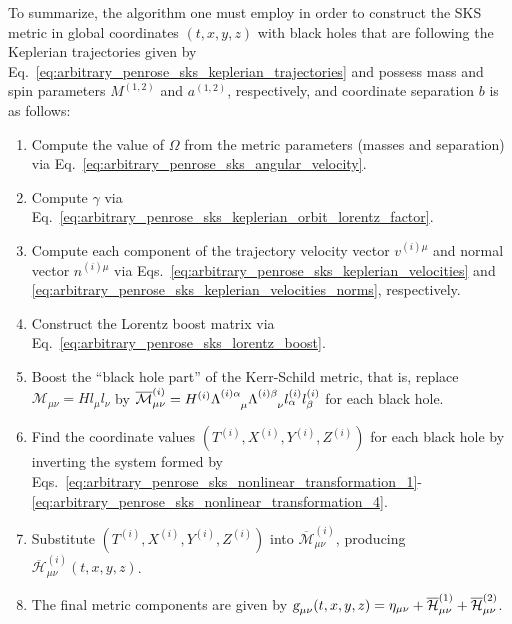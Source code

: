 To summarize, the algorithm one must employ in order to construct the SKS metric in global coordinates $(t,x,y,z)$ with black holes that are following the Keplerian trajectories given by Eq.~\eqref{eq:arbitrary_penrose_sks_keplerian_trajectories} and possess mass and spin parameters $M^{(1,2)}$ and $a^{(1,2)}$, respectively, and coordinate separation $b$ is as follows:
%
\begin{enumerate}
  \item Compute the value of $\Omega$ from the metric parameters (masses and separation) via Eq.~\eqref{eq:arbitrary_penrose_sks_angular_velocity}.
  \item Compute $\gamma$ via Eq.~\eqref{eq:arbitrary_penrose_sks_keplerian_orbit_lorentz_factor}.
  \item Compute each component of the trajectory velocity vector $v^{(i) \mu}$ and normal vector $n^{(i) \mu}$ via Eqs.~\eqref{eq:arbitrary_penrose_sks_keplerian_velocities} and \eqref{eq:arbitrary_penrose_sks_keplerian_velocities_norms}, respectively.
  \item Construct the Lorentz boost matrix via Eq.~\eqref{eq:arbitrary_penrose_sks_lorentz_boost}.
  \item Boost the ``black hole part'' of the Kerr-Schild metric, that is, replace  $\mathcal{M}_{\mu\nu} = H l_\mu l_\nu$ by $\overline{\mathcal{M}}^{(i)}_{\mu\nu} = H^{(i)} \tens{\Lambda}{(i) \alpha}{\mu} \tens{\Lambda}{(i) \beta}{\nu} l^{(i)}_\alpha l^{(i)}_\beta$ for each black hole.
  \item Find the coordinate values $(T^{(i)}, X^{(i)}, Y^{(i)}, Z^{(i)})$ for each black hole by inverting the system formed by Eqs.~\eqref{eq:arbitrary_penrose_sks_nonlinear_transformation_1}-\eqref{eq:arbitrary_penrose_sks_nonlinear_transformation_4}.
  \item Substitute $(T^{(i)}, X^{(i)}, Y^{(i)}, Z^{(i)})$ into $\overline{\mathcal{M}}^{(i)}_{\mu\nu}$, producing $\overline{\mathcal{H}}^{(i)}_{\mu\nu}(t,x,y,z)$.
  \item The final metric components are given by $\mtrtens{\mu}{\nu}(t,x,y,z) = \eta_{\mu\nu} + \overline{\mathcal{H}}^{(1)}_{\mu\nu} + \overline{\mathcal{H}}^{(2)}_{\mu\nu}$.
\end{enumerate}

